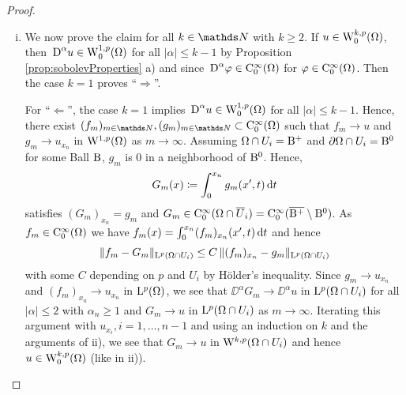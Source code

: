 \begin{proof}
\begin{enumerate}[i)]
      \item We now prove the claim for all $k \in \N$ with $k \geq 2$.
        If $u \in \mathrm{W}_0^{k,p}(\Omega)$, then $\,{\operatorname{D}}^\alpha u \in \mathrm{W}_0^{1,p}(\Omega)$ for all $|\alpha| \leq k -1$ by Proposition \ref{prop:sobolevProperties} a) and since $\,{\operatorname{D}}^\alpha \varphi \in \mathrm{C}_0^\infty(\Omega)$ for $\varphi \in \mathrm{C}_0^\infty(\Omega)$.
        Then the case $k = 1$ proves ``$\Rightarrow$''.

        For ``$\Leftarrow$'', the case $k = 1$ implies $\,{\operatorname{D}}^\alpha u \in \mathrm{W}_0^{1,p}(\Omega)$ for all $|\alpha| \leq k - 1$.
        Hence, there exist $(f_m)_{m \in \N}, (g_m)_{m \in \N} \subset \CC_0^\infty(\Omega)$ such that $f_m \to u$ and $g_m \to u_{x_n}$ in $\mathrm{W}^{1,p}(\Omega)$ as $m \to \infty$.
        Assuming $\Omega \cap U_i = \mathrm{B}^+$ and $\partial \Omega \cap U_i = \mathrm{B}^0$ for some Ball $\mathrm{B}$, $g_m$ is $0$ in a neighborhood of $\mathrm{B}^0$.
        Hence, 
        $$
        G_m(x) \coloneqq \int_0^{x_n} g_m(x',t) \, {\operatorname{d}\!{t}}
        $$
        satisfies $(G_m)_{x_n} = g_m$ and $G_m \in \mathrm{C}_0^\infty(\Omega \cap \overline U_i) = \mathrm{C}_0^\infty(\overline{\mathrm{B}^+}\setminus \mathrm{B}^0)$.
        As $f_m \in \mathrm{C}_0^\infty(\Omega)$ we have $f_m (x) = \int_0^{x_n} (f_m)_{x_n}(x', t) \, {\operatorname{d}\!{t}}$ and hence
        $$
        \|f_m - G_m\|_{\mathrm{L}^p(\Omega \cap U_i)} \leq C \, \|(f_m)_{x_n} - g_m \|_{\mathrm{L}^p(\Omega \cap U_i)}
        $$
        with some $C$ depending on $p$ and $U_i$ by Hölder's inequality.
        Since $g_m \to u_{x_n}$ and $(f_m)_{x_n} \to u_{x_n}$ in $\mathrm{L}^p(\Omega)$, we see that $\DD^\alpha G_m \to \DD^\alpha u$ in $\mathrm{L}^p(\Omega \cap U_i)$ for all $|\alpha|\leq 2$ with $\alpha_n \geq 1$ and $G_m \to u$ in $\mathrm{L}^p(\Omega \cap U_i)$ as $m \to \infty$.
        Iterating this argument with $u_{x_i}, i = 1,\dots, n - 1$ and using an induction on $k$ and the arguments of ii), we see that $G_m \to u$ in $\mathrm{W}^{k,p}(\Omega \cap U_i)$ and hence $u \in \mathrm{W}_0^{k,p}(\Omega)$ (like in ii)). \qedhere
  \end{enumerate}
\end{proof}
